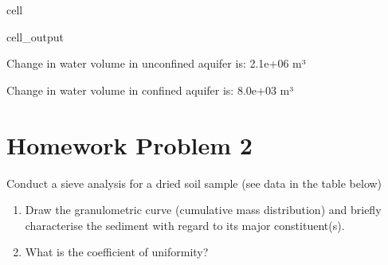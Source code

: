 \documentclass[letterpaper,10pt,english]{jupyterBook}
\begin{document}
\begin{sphinxuseclass}{cell}
\begin{sphinxVerbatimOutput}
\begin{sphinxuseclass}{cell_output}
\begin{sphinxVerbatim}[commandchars=\\\{\}]
Change in water volume in unconfined aquifer is: 2.1e+06 m³ 

Change in water volume in confined aquifer is: 8.0e+03 m³
\end{sphinxVerbatim}

\end{sphinxuseclass}\end{sphinxVerbatimOutput}

\end{sphinxuseclass}

\section{Homework Problem 2}
\label{\detokenize{content/tutorials/T4/tutorial_04:homework-problem-2}}
\sphinxAtStartPar
Conduct a sieve analysis for a dried soil sample (see data in the table below)
\begin{enumerate}
%
\item {} 
\sphinxAtStartPar
Draw the granulometric curve (cumulative mass distribution) and briefly characterise the sediment with regard to its major constituent(s).

\item {} 
\sphinxAtStartPar
What is the coefficient of uniformity?

\end{enumerate}
\end{document}
